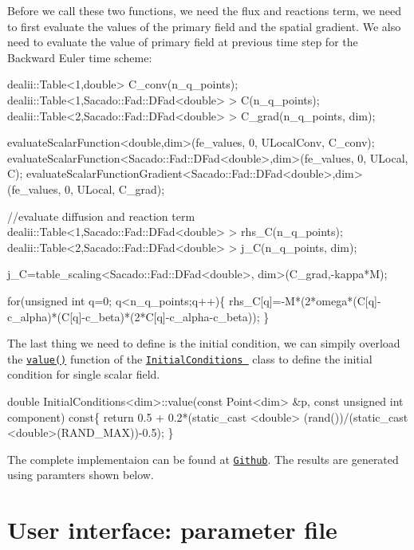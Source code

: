 Before we call these two functions, we need the flux and reactions term, we need to first evaluate the values of the primary field and the spatial gradient. We also need to evaluate the value of primary field at previous time step for the Backward Euler time scheme\-: 
\begin{DoxyCode}
dealii::Table<1,double>  C\_conv(n\_q\_points);
dealii::Table<1,Sacado::Fad::DFad<double> >  C(n\_q\_points);
dealii::Table<2,Sacado::Fad::DFad<double> >  C\_grad(n\_q\_points, dim);

evaluateScalarFunction<double,dim>(fe\_values, 0, ULocalConv, C\_conv);
evaluateScalarFunction<Sacado::Fad::DFad<double>,dim>(fe\_values, 0, ULocal, C); 
evaluateScalarFunctionGradient<Sacado::Fad::DFad<double>,dim>(fe\_values, 0, ULocal, C\_grad);

\textcolor{comment}{//evaluate diffusion and reaction term}
dealii::Table<1,Sacado::Fad::DFad<double> > rhs\_C(n\_q\_points);
dealii::Table<2,Sacado::Fad::DFad<double> > j\_C(n\_q\_points, dim);

j\_C=table\_scaling<Sacado::Fad::DFad<double>, dim>(C\_grad,-kappa*M);

\textcolor{keywordflow}{for}(\textcolor{keywordtype}{unsigned} \textcolor{keywordtype}{int} q=0; q<n\_q\_points;q++)\{
     rhs\_C[q]=-M*(2*omega*(C[q]-c\_alpha)*(C[q]-c\_beta)*(2*C[q]-c\_alpha-c\_beta));
 \}
\end{DoxyCode}
 The last thing we need to define is the initial condition, we can simpily overload the \href{../html/class_initial_conditions.html#a369cea7ba74f8cd0a6ca12e0c164ff74}{\tt value()} function of the \href{../html/class_initial_conditions.html}{\tt Initial\-Conditions } class to define the initial condition for single scalar field. 
\begin{DoxyCode}
\textcolor{keywordtype}{double} InitialConditions<dim>::value(\textcolor{keyword}{const} Point<dim>   &p, \textcolor{keyword}{const} \textcolor{keywordtype}{unsigned} \textcolor{keywordtype}{int}  component)\textcolor{keyword}{ const}\{
  \textcolor{keywordflow}{return} 0.5 + 0.2*(static\_cast <\textcolor{keywordtype}{double}> (rand())/(static\_cast <double>(RAND\_MAX))-0.5); 
\}
\end{DoxyCode}


The complete implementaion can be found at \href{https://github.com/mechanoChem/mechanoChemFEM/tree/example/Example3_Allen-Cahn}{\tt Github}. The results are generated using paramters shown below. \hypertarget{growth_file}{}\section{User interface\-: parameter file}\label{growth_file}

